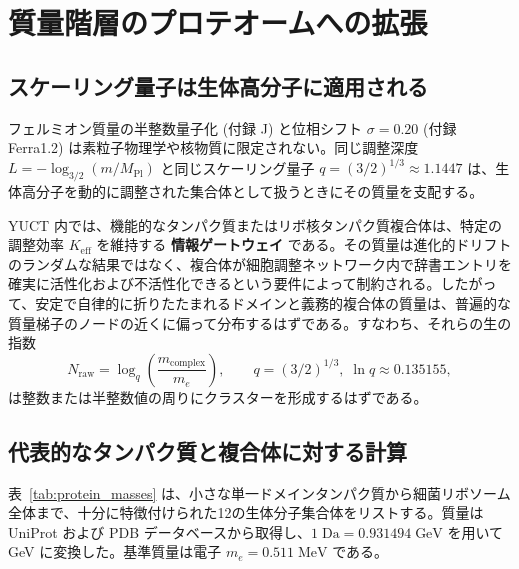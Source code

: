 \documentclass[12pt,a4paper]{ltjsarticle}
\begin{document}
	\section{質量階層のプロテオームへの拡張}
	\label{sec:protein_hierarchy}
	
	\subsection{スケーリング量子は生体高分子に適用される}
	
	フェルミオン質量の半整数量子化 (付録 J) と位相シフト \(\sigma = 0.20\) (付録 Ferra1.2) は素粒子物理学や核物質に限定されない。同じ調整深度 \(L = -\log_{3/2}(m/M_{\mathrm{Pl}})\) と同じスケーリング量子 \(q = (3/2)^{1/3} \approx 1.1447\) は、生体高分子を動的に調整された集合体として扱うときにその質量を支配する。
	
	YUCT 内では、機能的なタンパク質またはリボ核タンパク質複合体は、特定の調整効率 \(K_{\mathrm{eff}}\) を維持する \textbf{情報ゲートウェイ} である。その質量は進化的ドリフトのランダムな結果ではなく、複合体が細胞調整ネットワーク内で辞書エントリを確実に活性化および不活性化できるという要件によって制約される。したがって、安定で自律的に折りたたまれるドメインと義務的複合体の質量は、普遍的な質量梯子のノードの近くに偏って分布するはずである。すなわち、それらの生の指数
	\[
	N_{\mathrm{raw}} = \log_q\!\left(\frac{m_{\mathrm{complex}}}{m_e}\right),
	\qquad q = (3/2)^{1/3},\; \ln q \approx 0.135155,
	\]
	は整数または半整数値の周りにクラスターを形成するはずである。
	
	\subsection{代表的なタンパク質と複合体に対する計算}
	
	表~\ref{tab:protein_masses} は、小さな単一ドメインタンパク質から細菌リボソーム全体まで、十分に特徴付けられた12の生体分子集合体をリストする。質量は UniProt および PDB データベースから取得し、\(1\;\text{Da} = 0.931494\;\text{GeV}\) を用いて GeV に変換した。基準質量は電子 \(m_e = 0.511\;\text{MeV}\) である。
	
\end{document}

